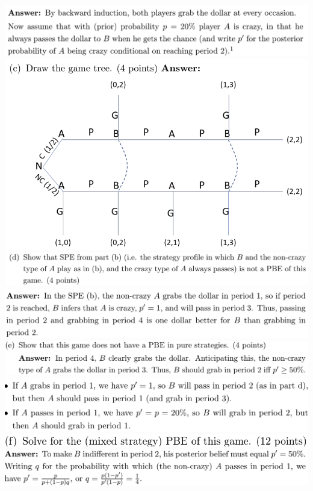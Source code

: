 \documentclass[8pt,landscape]{extarticle}
\begin{document}
\begin{multicols*}{3}
    \includegraphics[width=0.72\linewidth,keepaspectratio]{Screenshots/Screenshot 2024-03-11 172103.png}
    \includegraphics[width=0.6\linewidth,keepaspectratio]{Screenshots/Screenshot 2024-03-11 172109.png}
    \includegraphics[width=0.75\linewidth,keepaspectratio]{Screenshots/Screenshot 2024-03-11 172117.png}
    \includegraphics[width=0.71\linewidth,keepaspectratio]{Screenshots/Screenshot 2024-03-11 172121.png}
    \includegraphics[width=0.74\linewidth,keepaspectratio]{Screenshots/Screenshot 2024-03-11 172127.png}
    \includegraphics[width=0.68\linewidth,keepaspectratio]{Screenshots/Screenshot 2024-03-11 172131.png}
    \includegraphics[width=0.54\linewidth,keepaspectratio]{Screenshots/Screenshot 2024-03-11 172139.png}
    \includegraphics[width=0.7\linewidth,keepaspectratio]{Screenshots/Screenshot 2024-03-11 172148.png}

\end{multicols*}
\end{document}
